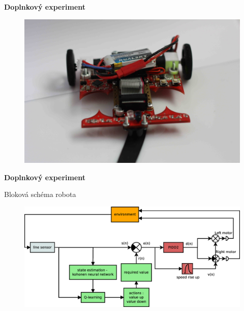 \documentclass[xcolor=dvipsnames]{beamer}
\begin{document}
\begin{frame}{\bf Doplnkový experiment}

\begin{figure}[!htb]
\centering
\includegraphics[scale=.05]{../pictures/motoko_aftermath_front.jpg}
\label{img:motoko_robot_photo}
\end{figure}

\end{frame}


\begin{frame}{\bf Doplnkový experiment}

Bloková schéma robota

\begin{figure}[!htb]
\centering
\includegraphics[scale=.25]{../diagrams/motoko_robot_block.eps}
\label{img:motoko_robot_block}
\end{figure}

\end{frame}
\end{document}
